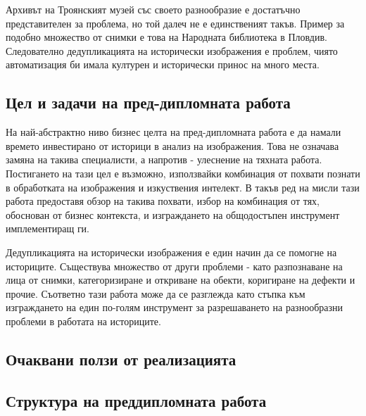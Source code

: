 \documentclass[a4paper,12pt]{article}
\begin{document}
\bigbreak

Архивът на Троянският музей със своето разнообразие е достатъчно представителен за проблема, но той далеч не е единственият такъв. Пример за подобно множество от снимки е това на Народната библиотека в Пловдив. Следователно дедупликацията на исторически изображения е проблем, чиято автоматизация би имала културен и исторически принос на много места.

\subsection{Цел и задачи на пред-дипломната работа}

На най-абстрактно ниво бизнес целта на пред-дипломната работа е да намали времето инвестирано от историци в анализ на изображения. Това не означава замяна на такива специалисти, а напротив - улеснение на тяхната работа. Постигането на тази цел е възможно, използвайки комбинация от похвати познати в обработката на изображения и изкуствения интелект. В такъв ред на мисли тази работа предоставя обзор на такива похвати, избор на комбинация от тях, обоснован от бизнес контекста, и изграждането на общодостъпен инструмент имплементиращ ги.

\bigbreak

Дедупликацията на исторически изображения е един начин да се помогне на историците. Съществува множество от други проблеми - като разпознаване на лица от снимки, категоризиране и откриване на обекти, коригиране на дефекти и прочие. Съответно тази работа може да се разглежда като стъпка към изграждането на един по-голям инструмент за разрешаването на разнообразни проблеми в работата на историците.

\subsection{Очаквани ползи от реализацията}


\subsection{Структура на преддипломната работа}
\end{document}
